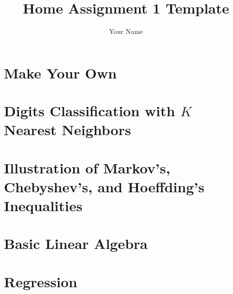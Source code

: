 \documentclass[a4paper,12pt]{article}
\begin{document}
\title{\large Home Assignment 1 Template}
\author{Your Name}
\maketitle
\tableofcontents
\newpage

\section{Make Your Own}

\section{Digits Classification with $K$ Nearest Neighbors}

\section{Illustration of Markov's, Chebyshev's, and Hoeffding's Inequalities}

\section{Basic Linear Algebra}

\section{Regression}
\end{document}
